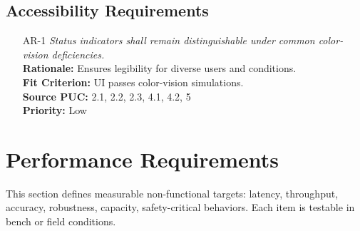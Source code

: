 \documentclass[12pt]{article}
\begin{document}
\subsection{Accessibility Requirements}
\begin{itemize}[leftmargin=*]
  \item[AR-1] \emph{Status indicators shall remain distinguishable under common
          color-vision deficiencies.}\\[2mm]
        \textbf{Rationale:} Ensures legibility for diverse users and conditions.\\
        \textbf{Fit Criterion:} UI passes color-vision simulations.\\
        \textbf{Source PUC:} 2.1, 2.2, 2.3, 4.1, 4.2, 5 \\
        \textbf{Priority:} Low
\end{itemize}

\section{Performance Requirements}
This section defines measurable non-functional targets: latency, throughput, accuracy, robustness, capacity, safety-critical behaviors.
Each item is testable in bench or field conditions.
\end{document}
